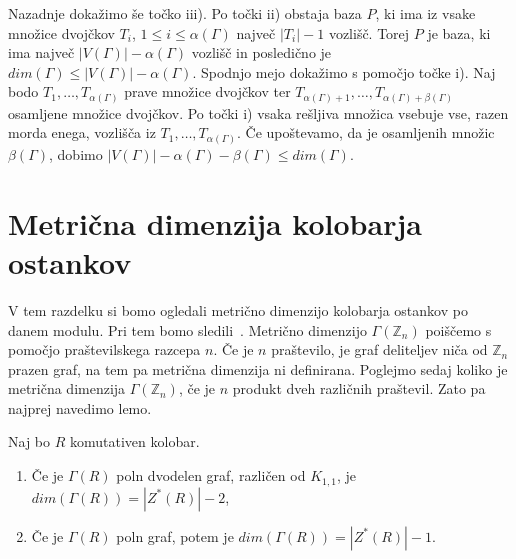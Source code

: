 \documentclass[mat1, tisk]{fmfdelo}
\newcommand{\Z}{\mathbb Z}
\begin{document}
\begin{dokaz}
  Nazadnje dokažimo še točko iii). Po točki ii) obstaja baza $P$, ki ima iz vsake 
  množice dvojčkov $T_i$, $1 \leq i \leq \alpha(\Gamma)$ največ $|T_i| - 1$ vozlišč. 
  Torej $P$ je baza, ki ima največ $|V(\Gamma)| - \alpha(\Gamma)$ vozlišč in 
  posledično je $dim(\Gamma) \leq |V(\Gamma)| - \alpha(\Gamma)$. Spodnjo mejo dokažimo s 
  pomočjo točke i). Naj bodo $T_1, \ldots, T_{\alpha(\Gamma)}$ prave množice dvojčkov ter 
  $T_{\alpha(\Gamma)+1}, \ldots, T_{\alpha(\Gamma)+\beta(\Gamma)}$ osamljene množice dvojčkov. 
  Po točki i) vsaka rešljiva množica vsebuje vse, razen morda enega, vozlišča iz 
  $T_1, \ldots, T_{\alpha(\Gamma)}$. Če upoštevamo, da je osamljenih množic $\beta(\Gamma)$, 
  dobimo $|V(\Gamma)| - \alpha(\Gamma) - \beta(\Gamma) \leq dim(\Gamma)$.
\end{dokaz}
%
%
%
\section{Metrična dimenzija kolobarja ostankov}
V tem razdelku si bomo ogledali metrično dimenzijo kolobarja ostankov po danem modulu. 
Pri tem bomo sledili~\cite{3pirzada14}. Metrično dimenzijo $\Gamma(\Z_{n})$ poiščemo 
s pomočjo praštevilskega razcepa $n$. Če je $n$ praštevilo, je graf deliteljev 
niča od $\Z_{n}$ prazen graf, na tem pa metrična dimenzija ni definirana. Poglejmo sedaj 
koliko je metrična dimenzija $\Gamma(\Z_{n})$, če je $n$ produkt dveh različnih praštevil. 
Zato pa najprej navedimo lemo.
%
\begin{lema}\label{lema3.1}
  Naj bo $R$ komutativen kolobar.
  \begin{enumerate}[label=({\alph*})]
    \item Če je $\Gamma(R)$ poln dvodelen graf, različen od $K_{1,1}$, je $dim(\Gamma(R)) = |Z^*(R)| - 2$,
    \item Če je $\Gamma(R)$ poln graf, potem je $dim(\Gamma(R)) = |Z^*(R)| - 1$.
    \end{enumerate}
\end{lema}
\end{document}
